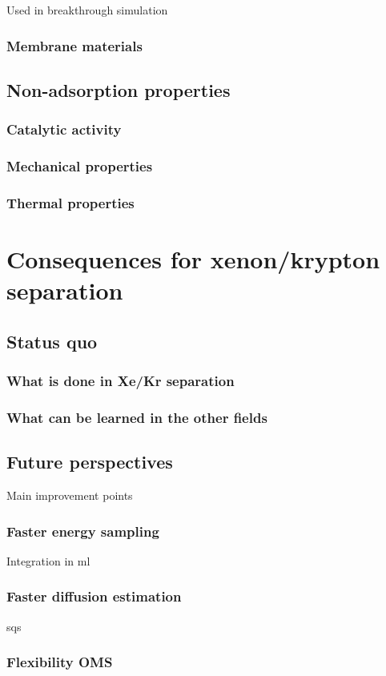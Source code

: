 \documentclass[thesis]{subfiles}
\begin{document}
Used in breakthrough simulation

\subsubsection{Membrane materials}

\subsection{Non-adsorption properties}

\subsubsection{Catalytic activity}

\subsubsection{Mechanical properties}

\subsubsection{Thermal properties}

\section{Consequences for xenon/krypton separation}

\subsection{Status quo}

\subsubsection{What is done in Xe/Kr separation}

\subsubsection{What can be learned in the other fields}

\subsection{Future perspectives}

Main improvement points

\subsubsection{Faster energy sampling}
Integration in ml
\subsubsection{Faster diffusion estimation}
sqs
\subsubsection{Flexibility OMS}

\OnlyInSubfile{\printglobalbibliography}
\end{document}
